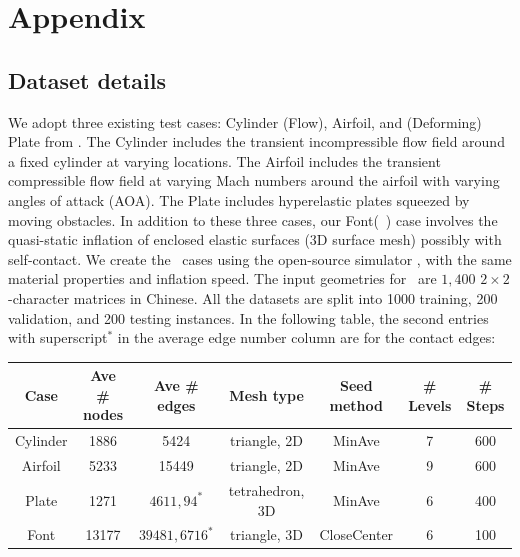 \newpage
\appendix
\onecolumn
\section{Appendix}
\subsection{Dataset details}
\label{sec:appdx:datasets}
We adopt three existing test cases: Cylinder (Flow), Airfoil, and (Deforming) Plate from \flatGNN. The Cylinder includes the transient incompressible flow field around a fixed cylinder at varying locations. The Airfoil includes the transient compressible flow field at varying Mach numbers around the airfoil with varying angles of attack (AOA). The Plate includes hyperelastic plates squeezed by moving obstacles.
In addition to these three cases, our Font(\fonts~) case involves the quasi-static inflation of enclosed elastic surfaces (3D surface mesh) possibly with self-contact. We create the \fonts~cases using the open-source simulator \cite{fang2021guaranteed}, with the same material properties and inflation speed. The input geometries for \fonts~are $1,400$ $2 \times 2$-character matrices in Chinese.
All the datasets are split into 1000 training, 200 validation, and 200 testing instances. In the following table, the second entries with superscript${ }^*$ in the average edge number column are for the contact edges:
\begin{table}[h]
    \centering
    \label{tab:dataset:details}
    \begin{tabular}{ccccccc}
        \textbf{Case} & \textbf{Ave \# nodes} & \textbf{Ave \#  edges} & \textbf{Mesh type} & \textbf{Seed method} & \textbf{\# Levels} & \textbf{\# Steps} \\ \hline
        Cylinder      & 1886                  & 5424                   & triangle, 2D       & MinAve               & 7                  & 600               \\
        Airfoil       & 5233                  & 15449                  & triangle, 2D       & MinAve               & 9                  & 600               \\
        Plate         & 1271                  & $4611, 94^*$           & tetrahedron, 3D    & MinAve               & 6                  & 400               \\
        Font          & 13177                 & $39481, 6716^*$        & triangle, 3D       & CloseCenter          & 6                  & 100
    \end{tabular}
\end{table}

